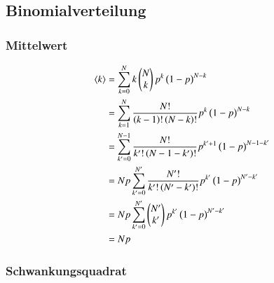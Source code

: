 \subsection{Binomialverteilung}

\subsubsection{Mittelwert}

\begin{align*}
\mw{k} &= \sum_{k=0}^N k\begin{pmatrix}N\\k\end{pmatrix}p^k\del{1-p}^{N-k} \\
       &= \sum_{k=1}^N \frac{N!}{\del{k-1}!\del{N-k}!}p^k\del{1-p}^{N-k} \\
       &= \sum_{k'=0}^{N-1} \frac{N!}{k'!\del{N-1-k'}!}p^{k'+1}\del{1-p}^{N-1-k'} \\
       &= Np\sum_{k'=0}^{N'} \frac{N'!}{k'!\del{N'-k'}!}p^{k'}\del{1-p}^{N'-k'}\\
       &= Np\sum_{k'=0}^{N'} \begin{pmatrix}N'\\k'\end{pmatrix}p^{k'}\del{1-p}^{N'-k'}\\
       &= Np
\end{align*}

\subsubsection{Schwankungsquadrat}


